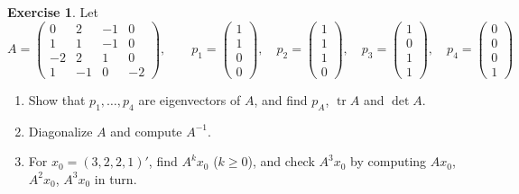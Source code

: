 \documentclass[12pt]{article}
\DeclareMathOperator{\tr}{tr}
\theoremstyle{definition}
\newtheorem{exercise}{Exercise}
\begin{document}
\begin{exercise}\label{r7-ex-powers}
Let
\[
A=\begin{pmatrix}0&2&-1&0\\1&1&-1&0\\-2&2&1&0\\1&-1&0&-2\end{pmatrix},\qquad
p_1=\begin{pmatrix}1\\1\\0\\0\end{pmatrix},\quad p_2=\begin{pmatrix}1\\1\\1\\0\end{pmatrix},\quad
p_3=\begin{pmatrix}1\\0\\1\\1\end{pmatrix},\quad p_4=\begin{pmatrix}0\\0\\0\\1\end{pmatrix}
\]
\begin{enumerate}
\item Show that \(p_1,\dots,p_4\) are eigenvectors of \(A\), and find \(p_A\), \(\tr A\) and \(\det A\).
\item Diagonalize \(A\) and compute \(A^{-1}\).
\item For \(x_0=(3,2,2,1)'\), find \(A^kx_0\) (\(k\geqslant0\)), and check \(A^3x_0\) by computing \(Ax_0\), \(A^2x_0\),
\(A^3x_0\) in turn.
\end{enumerate}
\end{exercise}
\end{document}
